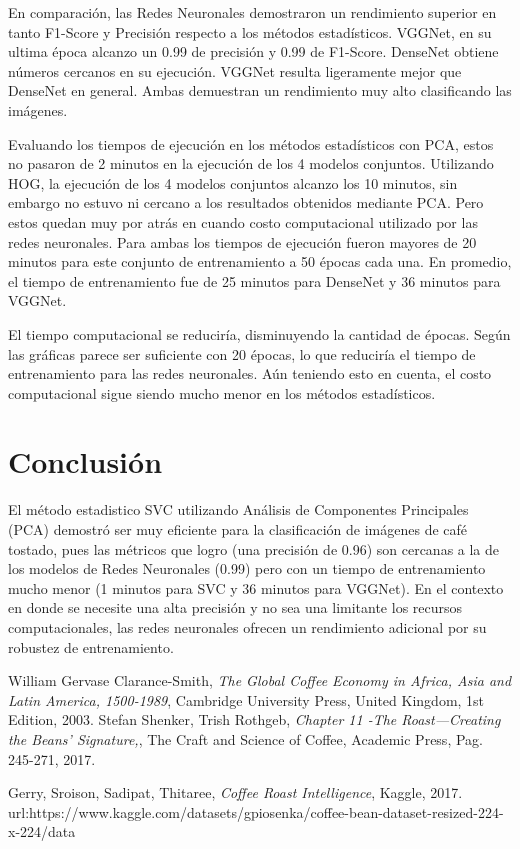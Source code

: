 \documentclass[twocolumn]{article}
\begin{document}
En comparación, las Redes Neuronales demostraron un rendimiento superior en tanto F1-Score y Precisión respecto a los métodos estadísticos. VGGNet, en su ultima época alcanzo un 0.99 de precisión y 0.99 de F1-Score. DenseNet obtiene números cercanos en su ejecución. VGGNet resulta ligeramente mejor que DenseNet en general. Ambas demuestran un rendimiento muy alto clasificando las imágenes. 

Evaluando los tiempos de ejecución en los métodos estadísticos con PCA, estos no pasaron de 2 minutos en la ejecución de los 4 modelos conjuntos. Utilizando HOG, la ejecución de los 4 modelos conjuntos alcanzo los 10 minutos, sin embargo no estuvo ni cercano a los resultados obtenidos mediante PCA. Pero estos quedan muy por atrás en cuando costo computacional utilizado por las redes neuronales. Para ambas los tiempos de ejecución fueron mayores de 20 minutos para este conjunto de entrenamiento a 50 épocas cada una. En promedio, el tiempo de entrenamiento fue de 25 minutos para DenseNet y 36 minutos para VGGNet.
 
El tiempo computacional se reduciría, disminuyendo la cantidad de épocas. Según las gráficas parece ser suficiente con 20 épocas, lo que reduciría el tiempo de entrenamiento para las redes neuronales. Aún teniendo esto en cuenta, el costo computacional sigue siendo mucho menor en los métodos estadísticos.

\section{Conclusión}

El método estadistico SVC utilizando Análisis de Componentes Principales (PCA) demostró ser muy eficiente para la clasificación de imágenes de café tostado, pues las métricos que logro (una precisión de 0.96) son cercanas a la de los modelos de Redes Neuronales (0.99) pero con un tiempo de entrenamiento mucho menor (1 minutos para SVC y 36 minutos para VGGNet). En el contexto en donde se necesite una alta precisión y no sea una limitante los recursos computacionales, las redes neuronales ofrecen un rendimiento adicional por su robustez de entrenamiento.


\begin{thebibliography}{9}

  
  William Gervase Clarance-Smith,
  \emph{The Global Coffee Economy in Africa, Asia and Latin America, 1500-1989},
  Cambridge University Press, United Kingdom,
  1st Edition,
  2003.
  Stefan Shenker, Trish Rothgeb,
  \emph{Chapter 11 -The Roast—Creating the Beans' Signature,},
  The Craft and Science of Coffee, Academic Press,
  Pag. 245-271,
  2017.
  
 Gerry, Sroison, Sadipat, Thitaree,
\emph{Coffee Roast Intelligence},
Kaggle,
2017.
url:https://www.kaggle.com/datasets/gpiosenka/coffee-bean-dataset-resized-224-x-224/data

\end{thebibliography}
\end{document}
